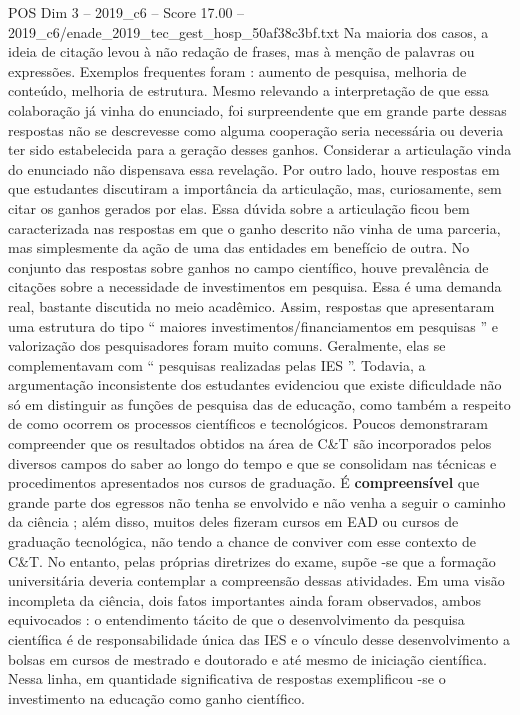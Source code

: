 \begin{textsample}{POS Dim 3 – 2019\_c6 – Score 17.00 – 2019\_c6/enade\_2019\_tec\_gest\_hosp\_50af38c3bf.txt}
Na maioria dos casos, a ideia de citação levou à não redação de frases, mas à menção de palavras ou expressões.
Exemplos frequentes foram : aumento de pesquisa, melhoria de conteúdo, melhoria de estrutura.
Mesmo relevando a interpretação de que essa colaboração já vinha do enunciado, foi surpreendente que em grande parte dessas respostas não se descrevesse como alguma cooperação seria necessária ou deveria ter sido estabelecida para a geração desses ganhos.
Considerar a articulação vinda do enunciado não dispensava essa revelação.
Por outro lado, houve respostas em que estudantes discutiram a importância da articulação, mas, curiosamente, sem citar os ganhos gerados por elas.
Essa dúvida sobre a articulação ficou bem caracterizada nas respostas em que o ganho descrito não vinha de uma parceria, mas simplesmente da ação de uma das entidades em benefício de outra.
No conjunto das respostas sobre ganhos no campo científico, houve prevalência de citações sobre a necessidade de investimentos em pesquisa.
Essa é uma demanda real, bastante discutida no meio acadêmico.
Assim, respostas que apresentaram uma estrutura do tipo “ maiores investimentos/financiamentos em pesquisas ” e valorização dos pesquisadores foram muito comuns.
Geralmente, elas se complementavam com “ pesquisas realizadas pelas IES ”.
Todavia, a argumentação inconsistente dos estudantes evidenciou que existe dificuldade não só em distinguir as funções de pesquisa das de educação, como também a respeito de como ocorrem os processos científicos e tecnológicos.
Poucos demonstraram compreender que os resultados obtidos na área de C\&T são incorporados pelos diversos campos do saber ao longo do tempo e que se consolidam nas técnicas e procedimentos apresentados nos cursos de graduação.
É \textbf{compreensível} que grande parte dos egressos não tenha se envolvido e não venha a seguir o caminho da ciência ; além disso, muitos deles fizeram cursos em EAD ou cursos de graduação tecnológica, não tendo a chance de conviver com esse contexto de C\&T.
No entanto, pelas próprias diretrizes do exame, supõe -se que a formação universitária deveria contemplar a compreensão dessas atividades.
Em uma visão incompleta da ciência, dois fatos importantes ainda foram observados, ambos equivocados : o entendimento tácito de que o desenvolvimento da pesquisa científica é de responsabilidade única das IES e o vínculo desse desenvolvimento a bolsas em cursos de mestrado e doutorado e até mesmo de iniciação científica.
Nessa linha, em quantidade significativa de respostas exemplificou -se o investimento na educação como ganho científico.

\end{textsample}

